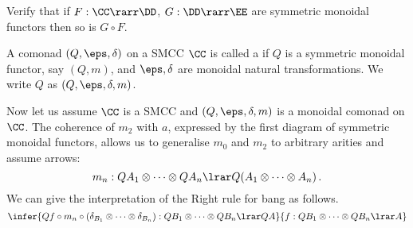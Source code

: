 \documentclass{svmult}
\begin{document}
\begin{myexercise}
Verify that if $F:\CC\rarr\DD$, $G:\DD\rarr\EE$ are symmetric monoidal functors then so is $G\circ F$.
\end{myexercise}
\begin{mydefinition}
A comonad $(Q,\eps,\delta)$ on a SMCC $\CC$ is called a  if $Q$ is a symmetric monoidal functor, say $(Q,m)$, and
$\eps,\delta$ are monoidal natural transformations. We write $Q$ as $(Q,\eps,\delta,m)$. \deq
\end{mydefinition}
%
Now let us assume $\CC$ is a SMCC and $(Q,\eps,\delta,m)$ is a monoidal comonad on $\CC$. The coherence of $m_2$ with $a$, expressed by the first
diagram of symmetric monoidal functors, allows us to generalise $m_0$ and $m_2$ to arbitrary arities and assume arrows:
\[ m_n: QA_1\otimes\cdots\otimes QA_n\lrar Q(A_1\otimes\cdots\otimes A_n)\,. \]
We can give the interpretation of the Right rule for bang as follows.
\[
\infer{Qf\circ m_n\circ(\delta_{B_1}\otimes\cdots\otimes\delta_{B_n}):QB_1\otimes\cdots\otimes QB_n\lrar QA}{f:QB_1\otimes\cdots\otimes QB_n\lrar A}
\]
\end{document}
